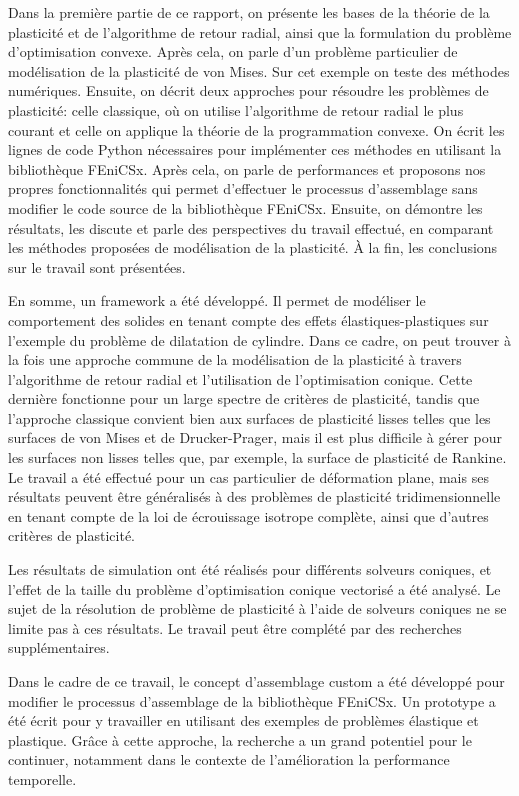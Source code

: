 \documentclass[12pt]{article}
\begin{document}
Dans la première partie de ce rapport, on présente les bases de la théorie de la plasticité et de l'algorithme de retour radial, ainsi que la formulation du problème d'optimisation convexe. Après cela, on parle d'un problème particulier de modélisation de la plasticité de von Mises. Sur cet exemple on teste des méthodes numériques. Ensuite, on décrit deux approches pour résoudre les problèmes de plasticité: celle classique, où on utilise l'algorithme de retour radial le plus courant et celle on applique la théorie de la programmation convexe. On écrit les lignes de code Python nécessaires pour implémenter ces méthodes en utilisant la bibliothèque FEniCSx. Après cela, on parle de performances et proposons nos propres fonctionnalités qui permet d'effectuer le processus d'assemblage sans modifier le code source de la bibliothèque FEniCSx. Ensuite, on démontre les résultats, les discute et parle des perspectives du travail effectué, en comparant les méthodes proposées de modélisation de la plasticité. À la fin, les conclusions sur le travail sont présentées.

En somme, un framework a été développé. Il permet de modéliser le comportement des solides en tenant compte des effets élastiques-plastiques sur l'exemple du problème de dilatation de cylindre. Dans ce cadre, on peut trouver à la fois une approche commune de la modélisation de la plasticité à travers l'algorithme de retour radial et l'utilisation de l'optimisation conique. Cette dernière fonctionne pour un large spectre de critères de plasticité, tandis que l'approche classique convient bien aux surfaces de plasticité lisses telles que les surfaces de von Mises et de Drucker-Prager, mais il est plus difficile à gérer pour les surfaces non lisses telles que, par exemple, la surface de plasticité de Rankine. Le travail a été effectué pour un cas particulier de déformation plane, mais ses résultats peuvent être généralisés à des problèmes de plasticité tridimensionnelle en tenant compte de la loi de écrouissage isotrope complète, ainsi que d'autres critères de plasticité.

Les résultats de simulation ont été réalisés pour différents solveurs coniques, et l'effet de la taille du problème d'optimisation conique vectorisé a été analysé. Le sujet de la résolution de problème de plasticité à l'aide de solveurs coniques ne se limite pas à ces résultats. Le travail peut être complété par des recherches supplémentaires.

Dans le cadre de ce travail, le concept d'assemblage custom a été développé pour modifier le processus d'assemblage de la bibliothèque FEniCSx. Un prototype a été écrit pour y travailler en utilisant des exemples de problèmes élastique et plastique. Grâce à cette approche, la recherche a un grand potentiel pour le continuer, notamment dans le contexte de l'amélioration la performance temporelle. 
\end{document}

